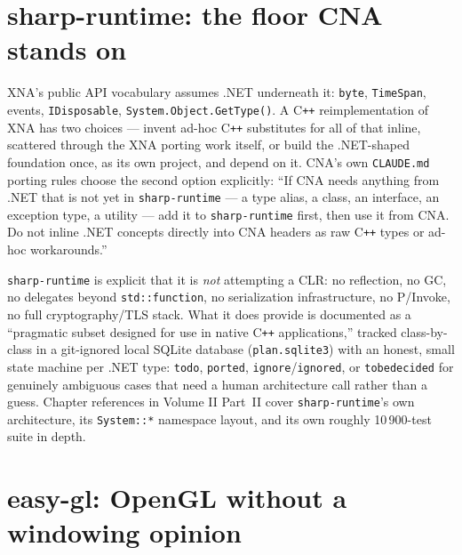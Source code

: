 \section{sharp-runtime: the floor CNA stands on}
\label{sec:sharp-runtime-intro}

XNA's public API vocabulary assumes .NET underneath it: \texttt{byte}, \texttt{TimeSpan},
events, \texttt{IDisposable}, \texttt{System.Object.GetType()}. A C\texttt{++} reimplementation
of XNA has two choices --- invent ad-hoc C\texttt{++} substitutes for all of that inline,
scattered through the XNA porting work itself, or build the .NET-shaped foundation once, as
its own project, and depend on it. CNA's own \texttt{CLAUDE.md} porting rules choose the
second option explicitly: ``If CNA needs anything from .NET that is not yet in
\texttt{sharp-runtime} --- a type alias, a class, an interface, an exception type, a utility
--- add it to \texttt{sharp-runtime} first, then use it from CNA. Do not inline .NET concepts
directly into CNA headers as raw C\texttt{++} types or ad-hoc workarounds.''

\texttt{sharp-runtime} is explicit that it is \emph{not} attempting a CLR: no reflection, no
GC, no delegates beyond \texttt{std::function}, no serialization infrastructure, no P/Invoke,
no full cryptography/TLS stack. What it does provide is documented as a ``pragmatic subset
designed for use in native C\texttt{++} applications,'' tracked class-by-class in a
git-ignored local SQLite database (\texttt{plan.sqlite3}) with an honest, small state machine
per .NET type: \texttt{todo}, \texttt{ported}, \texttt{ignore}/\texttt{ignored}, or
\texttt{tobedecided} for genuinely ambiguous cases that need a human architecture call rather
than a guess. Chapter references in Volume II Part~II cover \texttt{sharp-runtime}'s own
architecture, its \texttt{System::*} namespace layout, and its own roughly 10\,900-test suite
in depth.

\section{easy-gl: OpenGL without a windowing opinion}

